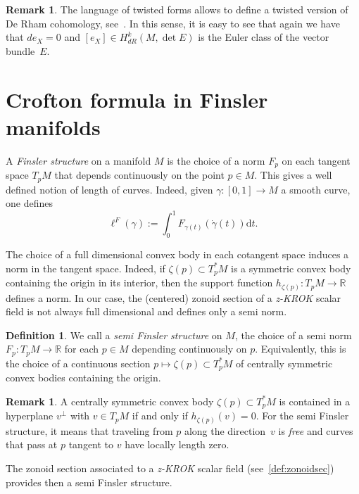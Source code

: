 \documentclass[10pt]{amsart}
\theoremstyle{definition}\newtheorem{defi}[theo]{Definition}\newtheorem{rema}[theo]{Remark}\newtheorem{exam}[theo]{Example}\newtheorem{exem}[theo]{Example}\newtheorem{nota}[theo]{Notation}
\newcommand{\R}{\mathbb{R}}
\newcommand{\dd}{\mathrm{d}}
\newcommand{\zkrok}{\emph{z-KROK}\xspace}
\begin{document}
\begin{rema}\label{rem:nonorient}
The language of twisted forms allows to define a twisted version of De Rham cohomology, see~\cite{botttu}. In this sense, it is easy to see that again we have that $d e_X=0$ and $[e_X]\in H_{dR}^k(M,\det E)$ is the Euler class of the vector bundle~$E$.
\end{rema}


\section{Crofton formula in Finsler manifolds}\label{sec:Finsler}

A \emph{Finsler structure} on a manifold $M$ is the choice of a norm $F_p$ on each tangent space $T_pM$ that depends continuously on the point $p\in M$. This gives a well defined notion of length of curves. Indeed, given $\gamma:[0,1]\to M$ a smooth curve, one defines
\begin{equation}\label{eq:lengthFinsler}
\ell^F(\gamma):=\int_0^1F_{\gamma(t)}(\dot{\gamma}(t))\dd t.
\end{equation}

The choice of a full dimensional convex body in each cotangent space induces a norm in the tangent space. Indeed, if $\zeta(p)\subset T^*_pM$ is a symmetric convex body containing the origin in its interior, then the support function $h_{\zeta(p)}:T_pM\to \R$ defines a norm. In our case, the (centered) zonoid section of a \zkrok scalar field is not always full dimensional and defines only a semi norm.

\begin{defi}
We call a \emph{semi Finsler structure} on $M$, the choice of a semi norm $F_p:T_pM\to \R$ for each $p\in M$ depending continuously on $p$. Equivalently, this is the choice of a continuous section $p\mapsto \zeta(p)\subset T^*_pM$ of centrally symmetric convex bodies containing the origin.
\end{defi}


\begin{rema}
A centrally symmetric convex body $\zeta(p)\subset T^*_pM$ is contained in a hyperplane $v^\perp$ with $v\in T_pM$ if and only if $h_{\zeta(p)}(v)=0$. For the semi Finsler structure, it means that traveling from $p$ along the direction~$v$ is \emph{free} and curves that pass at $p$ tangent to $v$ have locally length zero.
\end{rema}

The zonoid section associated to a \zkrok scalar field (see~\cref{def:zonoidsec}) provides then a semi Finsler structure.
\end{document}
